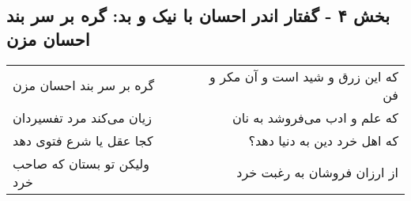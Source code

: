 \begin{center}
\section*{بخش ۴ - گفتار اندر احسان با نیک و بد: گره بر سر بند احسان مزن}
\label{sec:004}
\begin{longtable}{l p{0.5cm} r}
گره بر سر بند احسان مزن
&&
که این زرق و شید است و آن مکر و فن
\\
زیان می‌کند مرد تفسیردان
&&
که علم و ادب می‌فروشد به نان
\\
کجا عقل یا شرع فتوی دهد
&&
که اهل خرد دین به دنیا دهد؟
\\
ولیکن تو بستان که صاحب خرد
&&
از ارزان فروشان به رغبت خرد
\\
\end{longtable}
\end{center}
